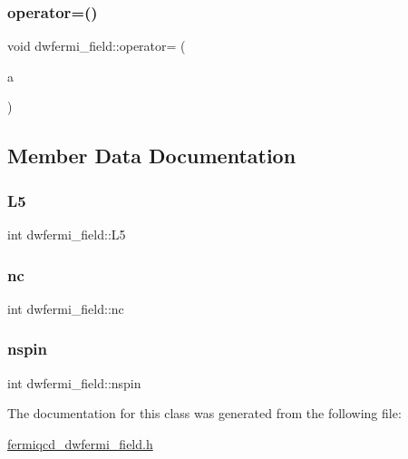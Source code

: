 \subsubsection{\texorpdfstring{operator=()}{operator=()}}
{\footnotesize\ttfamily void dwfermi\+\_\+field\+::operator= (\begin{DoxyParamCaption}\item[{\hyperlink{classmdp__complex}{mdp\+\_\+complex}}]{a }\end{DoxyParamCaption})\hspace{0.3cm}{\ttfamily [inline]}}



\subsection{Member Data Documentation}
\mbox{\label{classdwfermi__field_a8bb8d2f33c7060b39da0563969b712a9}} 
\subsubsection{\texorpdfstring{L5}{L5}}
{\footnotesize\ttfamily int dwfermi\+\_\+field\+::\+L5}

\mbox{\label{classdwfermi__field_ab4c38d0b9f1016a5b121eced43a19370}} 
\subsubsection{\texorpdfstring{nc}{nc}}
{\footnotesize\ttfamily int dwfermi\+\_\+field\+::nc}

\mbox{\label{classdwfermi__field_ac56aca6bd128b92467fdf7dca86535aa}} 
\subsubsection{\texorpdfstring{nspin}{nspin}}
{\footnotesize\ttfamily int dwfermi\+\_\+field\+::nspin}



The documentation for this class was generated from the following file\+:\begin{DoxyCompactItemize}
\item 
\hyperlink{fermiqcd__dwfermi__field_8h}{fermiqcd\+\_\+dwfermi\+\_\+field.\+h}\end{DoxyCompactItemize}
